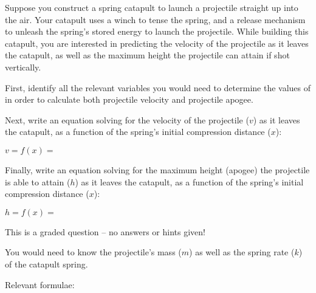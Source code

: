 

Suppose you construct a spring catapult to launch a projectile straight up into the air.  Your catapult uses a winch to tense the spring, and a release mechanism to unleash the spring's stored energy to launch the projectile.  While building this catapult, you are interested in predicting the velocity of the projectile as it leaves the catapult, as well as the maximum height the projectile can attain if shot vertically.

\vskip 10pt

First, identify all the relevant variables you would need to determine the values of in order to calculate both projectile velocity and projectile apogee.

\vskip 50pt

Next, write an equation solving for the velocity of the projectile ($v$) as it leaves the catapult, as a function of the spring's initial compression distance ($x$):

\vskip 10pt

$v = f(x) = $

\vskip 50pt

Finally, write an equation solving for the maximum height (apogee) the projectile is able to attain ($h$) as it leaves the catapult, as a function of the spring's initial compression distance ($x$):

\vskip 10pt

$h = f(x) = $

\vfil

\eject






This is a graded question -- no answers or hints given!
 






You would need to know the projectile's mass ($m$) as well as the spring rate ($k$) of the catapult spring.

\vskip 10pt

Relevant formulae:

\vskip 10pt

